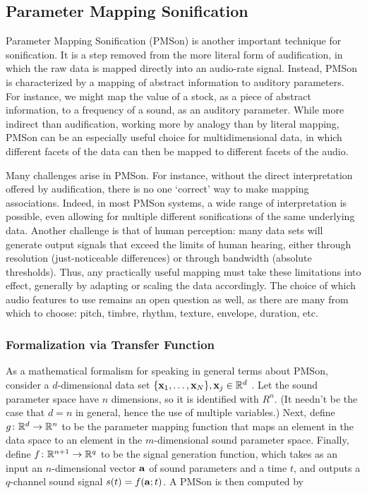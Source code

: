 \subsection{Parameter Mapping Sonification}
Parameter Mapping Sonification (PMSon) is another important technique for 
sonification. It is a step removed from the more literal form of 
audification, in which the raw data is mapped directly into an audio-rate 
signal. Instead, PMSon is characterized by a mapping of abstract information 
to auditory parameters. For instance, we might map the value of a stock, as a 
piece of abstract information, to a frequency of a sound, as an auditory 
parameter. While more indirect than audification, working more by analogy 
than by literal mapping, PMSon can be an especially useful choice for 
multidimensional data, in which different facets of the data can then be 
mapped to different facets of the audio.

Many challenges arise in PMSon. For instance, without the direct 
interpretation offered by audification, there is no one `correct' way to make 
mapping associations. Indeed, in most PMSon systems, a wide range of 
interpretation is possible, even allowing for multiple different 
sonifications of the same underlying data. Another challenge is that of human 
perception: many data sets will generate output signals that exceed the 
limits of human hearing, either through resolution (just-noticeable 
differences) or through bandwidth (absolute thresholds). Thus, any 
practically useful mapping must take these limitations into effect, generally 
by adapting or scaling the data accordingly. The choice of which audio 
features to use remains an open question as well, as there are many from 
which to choose: pitch, timbre, rhythm, texture, envelope, duration, etc. 

\subsubsection{Formalization via Transfer Function}
As a mathematical formalism for speaking in general terms about PMSon, 
consider a $d$-dimensional data set $\{\mathbf{x}_1, \dots, \mathbf{x}_N\}, \mathbf{x}_j \in \mathbb{R}^d$
. Let the sound parameter space have $n$ dimensions, so it is identified with 
$R^n$. (It needn't be the case that $d = n$ in general, hence the use of 
multiple variables.) Next, define $g \colon \mathbb{R}^d \rightarrow \mathbb{R}^n$ to be the 
parameter mapping function that maps an element in the data space to an 
element in the $m$-dimensional sound parameter space.  Finally, define $f 
\colon \mathbb{R}^{n + 1} \rightarrow \mathbb{R}^q$ to be the signal generation function, 
which takes as an input an $n$-dimensional vector $\mathbf{a}$ of sound parameters 
and a time $t$, and outputs a $q$-channel sound signal $s(t) = f(\mathbf{a}; t)$. A 
PMSon is then computed by


